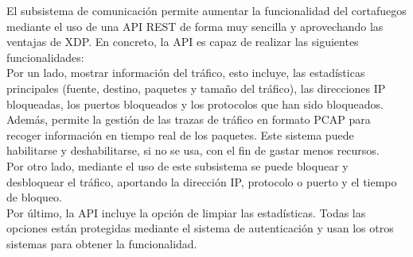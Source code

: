 El subsistema de comunicación permite aumentar la funcionalidad del cortafuegos mediante el uso de una API REST de forma muy sencilla y aprovechando las ventajas de XDP. En concreto, la API es capaz de realizar las siguientes funcionalidades:
\\ Por un lado, mostrar información del tráfico, esto incluye, las estadísticas principales (fuente, destino, paquetes y tamaño del tráfico), las direcciones IP bloqueadas, los puertos bloqueados y los protocolos que han sido bloqueados.
\\ Además, permite la gestión de las trazas de tráfico en formato PCAP para recoger información en tiempo real de los paquetes. Este sistema puede habilitarse y deshabilitarse, si no se usa, con el fin de gastar menos recursos.
\\Por otro lado, mediante el uso de este subsistema se puede bloquear y desbloquear el tráfico, aportando la dirección IP, protocolo o puerto y el tiempo de bloqueo.
\\Por último, la API incluye la opción de limpiar las estadísticas. Todas las opciones están protegidas mediante el sistema de autenticación y usan los otros sistemas para obtener la funcionalidad.